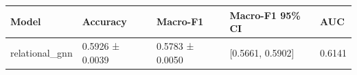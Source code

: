 \begin{tabular}{lllll}
\toprule
Model & Accuracy & Macro-F1 & Macro-F1 95\% CI & AUC \\
\midrule
relational\_gnn & 0.5926 ± 0.0039 & 0.5783 ± 0.0050 & [0.5661, 0.5902] & 0.6141 \\
\bottomrule
\end{tabular}
